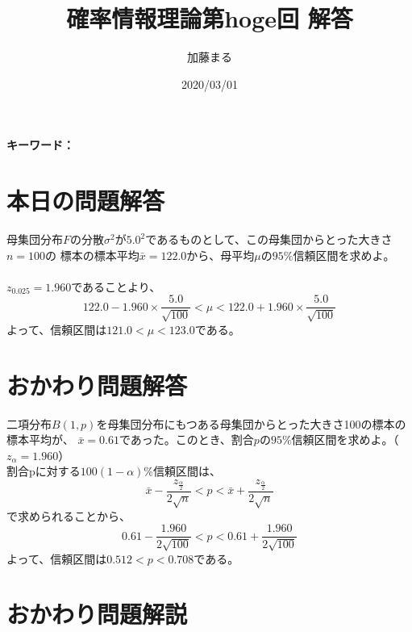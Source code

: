 \documentclass[a4j,uplatex,dvipdfmx]{jsarticle}
\title{確率情報理論第hoge回 解答}
\author{加藤まる}
\date{2020/03/01}
\begin{document}
\maketitle
\bf キーワード：
\rm

\section*{本日の問題解答}
母集団分布$F$の分散$\sigma ^2$が$5.0^2$であるものとして、この母集団からとった大きさ$n=100$の
標本の標本平均$\bar{x}=122.0$から、母平均$\mu$の$95\%$信頼区間を求めよ。
\\ \\ 
$z_{0.025}=1.960$であることより、
\begin{equation}
  122.0-1.960\times \frac{5.0}{\sqrt{100}} < \mu < 122.0+1.960\times \frac{5.0}{\sqrt{100}}
\end{equation}
よって、信頼区間は$121.0<\mu < 123.0$である。


\section*{おかわり問題解答}
二項分布$B(1,p)$を母集団分布にもつある母集団からとった大きさ100の標本の標本平均が、
$\bar{x}=0.61$であった。このとき、割合$p$の$95 \%$信頼区間を求めよ。（$z_α =1.960$）\\
割合pに対する$100(1-α)\%$信頼区間は、
\begin{equation}
  \bar{x}-\frac{z_{\frac{α}{2}}}{2\sqrt{n}} < p < \bar{x}+\frac{z_{\frac{α}{2}}}{2\sqrt{n}}
\end{equation}
で求められることから、
\begin{equation}
  0.61 - \frac{1.960}{2\sqrt{100}} < p < 0.61 + \frac{1.960}{2\sqrt{100}}
\end{equation}
よって、信頼区間は$0.512<p<0.708$である。


\section*{おかわり問題解説}
\end{document}
